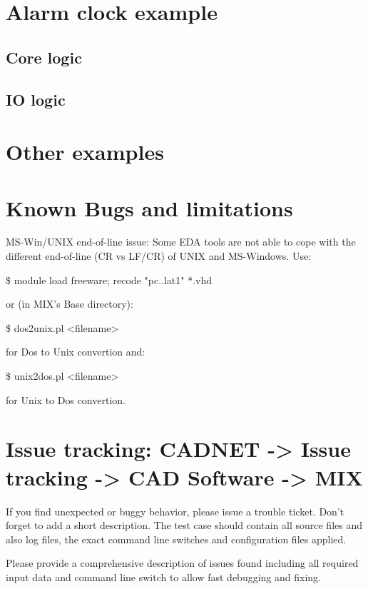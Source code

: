 \documentclass[a4paper,12pt]{article}
\begin{document}
\section{Alarm clock example}
\subsection{Core logic}
\subsection{IO logic}
\section{Other examples}

\section{Known Bugs and limitations}
MS-Win/UNIX end-of-line issue:
Some EDA tools are not able to cope with the\newline
different end-of-line (CR vs LF/CR) of UNIX and MS-Windows. Use:\newline
\hspace*{15mm}\begin{tt}\$ module load freeware; recode "pc..lat1" *.vhd\end{tt}\newline
or (in MIX's Base directory):\newline
\hspace*{15mm}\begin{tt}\$ dos2unix.pl <filename>\end{tt}\newline
for Dos to Unix convertion and:\newline
\hspace*{15mm}\begin{tt}\$ unix2dos.pl <filename>\end{tt}\newline
for Unix to Dos convertion.

\section{Issue tracking: CADNET -> Issue tracking -> CAD Software -> MIX}
If you find unexpected or buggy behavior, please issue a trouble ticket. Don't forget to add a short description. The test case should contain all source files and also log files, the exact command line switches and configuration files applied.\newline
\begin{it}Please provide a comprehensive description of issues found including all required input data and command line switch to allow fast debugging and fixing.\end{it}
\end{document}
